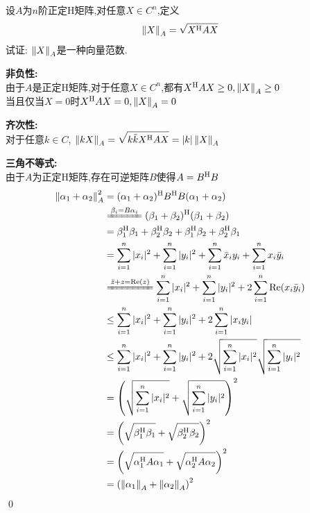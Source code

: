 \documentclass{matrix-homework}
\begin{document}

\section{}
设$A$为$n$阶正定H矩阵,对任意$X\in C^n$,定义$$\left\lVert X \right\rVert_A=\sqrt{X^{\mathrm{H}} AX}$$试证: $\left\lVert X \right\rVert_A$是一种向量范数.

\answer
\textbf{非负性:}\\由于$A$是正定H矩阵,对于任意$X\in C^n$,都有$X^{\mathrm{H}} AX\ge0,\left\lVert X \right\rVert_A\ge0$\\当且仅当$X=0$时$X^{\mathrm{H}} AX=0,\left\lVert X \right\rVert_A=0$

\textbf{齐次性:}\\对于任意$k\in C$, $\left\lVert kX \right\rVert_A= \displaystyle\sqrt{k\bar{k}X^{\mathrm{H}} AX}= |k|\left\lVert X \right\rVert_A$

\textbf{三角不等式:}\\由于$A$为正定H矩阵,存在可逆矩阵$B$使得$A=B^{\mathrm{H}} B$
\begin{align*}
    \norm{\alpha_1+\alpha_2}^2_A & = (\alpha_1+\alpha_2)^\HH B^\HH B(\alpha_1+\alpha_2)                                                                   \\
                                 & \xlongequal[]{\beta_i=B\alpha_i} (\beta_1+\beta_2)^\HH(\beta_1+\beta_2)                                                \\
                                 & = \beta_1^\HH\beta_1 + \beta_2^\HH\beta_2 + \beta_1^\HH\beta_2 + \beta_2^\HH\beta_1                                    \\
                                 & =\sum_{i=1}^{n}|x_i|^2 + \sum_{i=1}^{n}|y_i|^2 + \sum_{i=1}^{n}\bar{x}_iy_i + \sum_{i=1}^{n}x_i\bar{y}_i               \\
                                 & \xlongequal[]{\bar{z}+z=\mr{Re}(z)}\sum_{i=1}^{n}|x_i|^2 + \sum_{i=1}^{n}|y_i|^2 +2\sum_{i=1}^{n}\mr{Re}(x_i\bar{y}_i) \\
                                 & \le \sum_{i=1}^{n}|x_i|^2 + \sum_{i=1}^{n}|y_i|^2 + 2\sum_{i=1}^{n} |x_iy_i|                                           \\
                                 & \le \sum_{i=1}^{n}|x_i|^2 + \sum_{i=1}^{n}|y_i|^2 + 2\sqrt{\sum_{i=1}^{n}|x_i|^2}\sqrt{\sum_{i=1}^{n}|y_i|^2}          \\
                                 & =\left(\sqrt{\sum_{i=1}^{n}|x_i|^2} + \sqrt{\sum_{i=1}^{n}|y_i|^2}\right)^2                                            \\
                                 & =\left(\sqrt{\beta_1^\HH\beta_1} + \sqrt{\beta_2^\HH\beta_2}\right)^2                                                  \\
                                 & =\left(\sqrt{\alpha_1^\HH A\alpha_1} + \sqrt{\alpha_2^\HH A\alpha_2}\right)^2                                          \\
                                 & =\left(\norm{\alpha_1}_A + \norm{\alpha_2}_A\right)^2
\end{align*}
\qed
\end{document}
